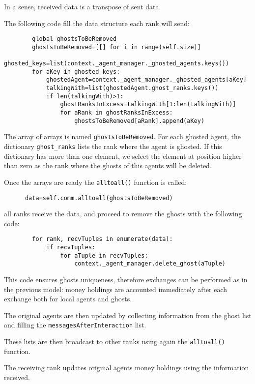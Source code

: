 \documentclass{article}
\begin{document}
In a sense, received data is a transpose of sent data.

The following code fill the data structure each rank will send:
\begin{verbatim}
        global ghostsToBeRemoved
        ghostsToBeRemoved=[[] for i in range(self.size)]
        ghosted_keys=list(context._agent_manager._ghosted_agents.keys())
        for aKey in ghosted_keys:
            ghostedAgent=context._agent_manager._ghosted_agents[aKey]
            talkingWith=list(ghostedAgent.ghost_ranks.keys())
            if len(talkingWith)>1:
                ghostRanksInExcess=talkingWith[1:len(talkingWith)]
                for aRank in ghostRanksInExcess:
                    ghostsToBeRemoved[aRank].append(aKey)
\end{verbatim}

The array of arrays is named \verb+ghostsToBeRemoved+. For each ghosted agent, the dictionary \verb+ghost_ranks+ lists the rank where the agent is ghosted. If this dictionary has more than one element, we select the element at position higher than zero as the rank where the ghosts of this agents will be deleted.

Once the arrays are ready the \verb+alltoall()+ function is called:
\begin{verbatim}
      data=self.comm.alltoall(ghostsToBeRemoved)
\end{verbatim}
all ranks receive the data, and proceed to remove the ghosts with the following code:
\begin{verbatim}
        for rank, recvTuples in enumerate(data):
            if recvTuples:
                for aTuple in recvTuples:
                    context._agent_manager.delete_ghost(aTuple)
\end{verbatim}


This code ensures ghosts uniqueness, therefore exchanges can be performed as in the previous model: money holdings are accounted
immediately after each exchange both for local agents and ghosts.

The original agents are then updated by collecting information from the ghost list and filling the \verb+messagesAfterInteraction+ list.

These lists are then broadcast to other ranks using again the \verb+alltoall()+ function.

The receiving rank updates original agents money holdings using the information received.

   
\end{document}
